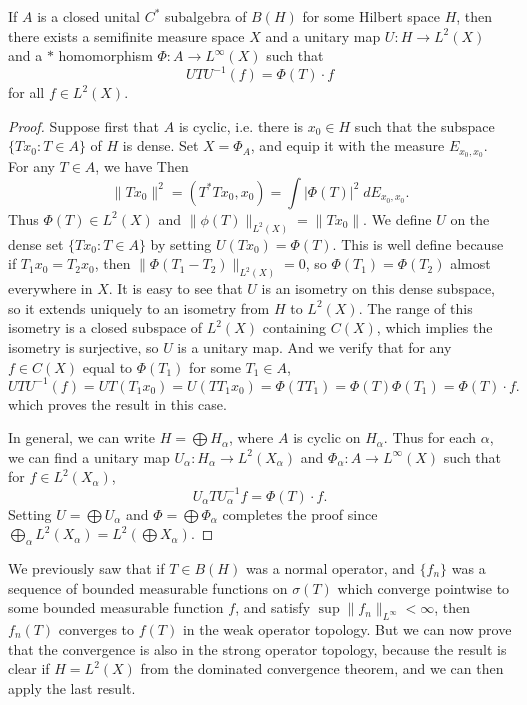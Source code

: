 \begin{theorem}
    If $A$ is a closed unital $C^*$ subalgebra of $B(H)$ for some Hilbert space $H$, then there exists a semifinite measure space $X$ and a unitary map $U: H \to L^2(X)$ and a $*$ homomorphism $\Phi: A \to L^\infty(X)$ such that
    \[ UTU^{-1}(f) = \Phi(T) \cdot f \]
    for all $f \in L^2(X)$.
\end{theorem}
\begin{proof}
    Suppose first that $A$ is cyclic, i.e. there is $x_0 \in H$ such that the subspace $\{ Tx_0 : T \in A \}$ of $H$ is dense. Set $X = \Phi_A$, and equip it with the measure $E_{x_0,x_0}$. For any $T \in A$, we have
    Then
    \[ \| Tx_0 \|^2 = (T^*T x_0, x_0) = \int |\Phi(T)|^2\; dE_{x_0,x_0}. \]
    Thus $\Phi(T) \in L^2(X)$ and $\| \phi(T) \|_{L^2(X)} = \| Tx_0 \|$. We define $U$ on the dense set $\{ Tx_0 : T \in A \}$ by setting $U(Tx_0) = \Phi(T)$. This is well define because if $T_1 x_0 = T_2 x_0$, then $\| \Phi(T_1 - T_2) \|_{L^2(X)} = 0$, so $\Phi(T_1) = \Phi(T_2)$ almost everywhere in $X$. It is easy to see that $U$ is an isometry on this dense subspace, so it extends uniquely to an isometry from $H$ to $L^2(X)$. The range of this isometry is a closed subspace of $L^2(X)$ containing $C(X)$, which implies the isometry is surjective, so $U$ is a unitary map. And we verify that for any $f \in C(X)$ equal to $\Phi(T_1)$ for some $T_1 \in A$,
    \[ UTU^{-1}(f) = UT(T_1 x_0) = U(TT_1 x_0) = \Phi(TT_1) = \Phi(T) \Phi(T_1) = \Phi(T) \cdot f. \]
    which proves the result in this case.

    In general, we can write $H = \bigoplus H_\alpha$, where $A$ is cyclic on $H_\alpha$. Thus for each $\alpha$, we can find a unitary map $U_\alpha: H_\alpha \to L^2(X_\alpha)$ and $\Phi_\alpha: A \to L^\infty(X)$ such that for $f \in L^2(X_\alpha)$,
    \[ U_\alpha T U_\alpha^{-1} f = \Phi(T) \cdot f. \]
    Setting $U = \bigoplus U_\alpha$ and $\Phi = \bigoplus \Phi_\alpha$ completes the proof since $\bigoplus_\alpha L^2(X_\alpha) = L^2(\bigoplus X_\alpha)$.
\end{proof}

We previously saw that if $T \in B(H)$ was a normal operator, and $\{ f_n \}$ was a sequence of bounded measurable functions on $\sigma(T)$ which converge pointwise to some bounded measurable function $f$, and satisfy $\sup \| f_n \|_{L^\infty} < \infty$, then $f_n(T)$ converges to $f(T)$ in the weak operator topology. But we can now prove that the convergence is also in the strong operator topology, because the result is clear if $H = L^2(X)$ from the dominated convergence theorem, and we can then apply the last result.

















